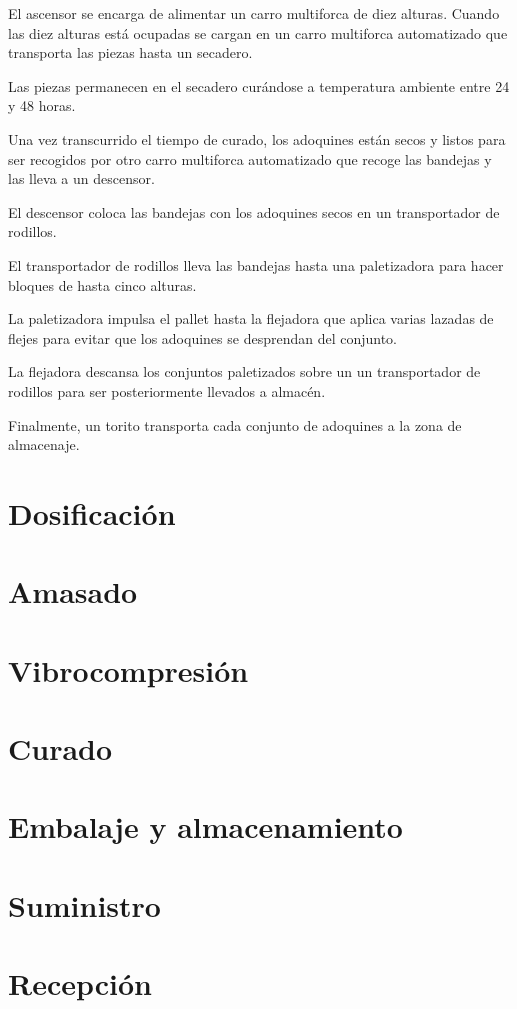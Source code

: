 El ascensor se encarga de alimentar un carro multiforca de diez alturas. Cuando las diez alturas está ocupadas se cargan en un carro multiforca automatizado que transporta las piezas hasta un secadero.

Las piezas permanecen en el secadero curándose a temperatura ambiente entre 24 y 48 horas.

Una vez transcurrido el tiempo de curado, los adoquines están secos y listos para ser recogidos por otro carro multiforca automatizado que recoge las bandejas y las lleva a un descensor.

El descensor coloca las bandejas con los adoquines secos en un transportador de rodillos.

El transportador de rodillos lleva las bandejas hasta una paletizadora para hacer bloques de hasta cinco alturas.

La paletizadora impulsa el pallet hasta la flejadora que aplica varias lazadas de flejes para evitar que los adoquines se desprendan del conjunto.

La flejadora descansa los conjuntos paletizados sobre un un transportador de rodillos para ser posteriormente llevados a almacén.

Finalmente, un torito transporta cada conjunto de adoquines a la zona de almacenaje.


\section{Dosificación}
\section{Amasado}
\section{Vibrocompresión}
\section{Curado}
\section{Embalaje y almacenamiento}
\section{Suministro}
\section{Recepción}
